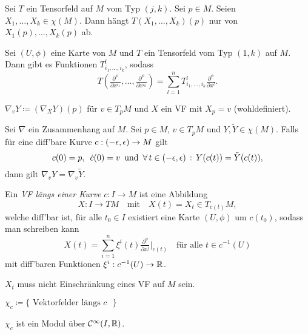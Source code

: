 \documentclass{cheat-sheet}
\newcommand{\coord}[1]{\tfrac{\partial^\phi}{\partial x^{#1}}} %
\newcommand{\vinterval}{\ointerval{-\epsilon}{\epsilon}} %
\newcommand{\Cont}{\mathcal{C}} %
\begin{document}
\begin{satz}
  Sei $T$ ein Tensorfeld auf $M$ vom Typ $(j, k)$. Sei $p \in M$. Seien $X_1, \ldots, X_k \in \chi(M)$. Dann hängt $T(X_1, \ldots, X_k)(p)$ nur von $X_1(p), \ldots, X_k(p)$ ab.
\end{satz}


\begin{bem}
  Sei $(U, \phi)$ eine Karte von $M$ und $T$ ein Tensorfeld vom Typ $(1, k)$ auf $M$. Dann gibt es Funktionen $T_{i_1, \ldots, i_k}^l$, sodass
  \[ T(\coord{i_1}, \ldots, \coord{i_k}) = \sum_{l=1}^n T_{i_1, \ldots, i_k}^l \coord{l}. \]
\end{bem}

\begin{nota}
  $\nabla_v Y \coloneqq (\nabla_X Y)(p)$ für $v \in T_p M$ und $X$ ein VF mit $X_p = v$ (wohldefiniert).
\end{nota}

\begin{satz}
  Sei $\nabla$ ein Zusammenhang auf $M$. Sei $p \in M$, $v \in T_p M$ und $Y, \tilde{Y} \in \chi(M)$. Falls für eine diff'bare Kurve $c : \vinterval \to M$ gilt
  \[
    c(0) = p, \enspace
    \dot{c}(0) = v \enspace \text{und} \enspace
    \fa{t \in \vinterval} Y(c(t)) = \tilde{Y}(c(t)),
  \]
  dann gilt $\nabla_v Y = \nabla_v \tilde{Y}$.
\end{satz}


\begin{defn}
  Ein \emph{VF längs einer Kurve} $c : I \to M$ ist eine Abbildung
  \[
    X : I \to TM
    \quad \text{mit} \quad
    X(t) = X_t \in T_{c(t)} M,
  \]
  welche diff'bar ist, \dh{} für alle $t_0 \in I$ existiert eine Karte $(U, \phi)$ um $c(t_0)$, sodass man schreiben kann
  \[
    X(t) = \sum_{i=1}^n \xi^i(t) \coord{j}|_{c(t)} \quad \text{für alle } t \in c^{-1}(U)
  \]
  mit diff'baren Funktionen $\xi^i : c^{-1}(U) \to \mathbb{R}$.
\end{defn}

\begin{bem}
  $X_t$ muss nicht Einschränkung eines VF auf $M$ sein.
\end{bem}

\begin{nota}
  $\chi_c \coloneqq \{ \text{ Vektorfelder längs $c$ } \}$
\end{nota}

\begin{bem}
  $\chi_c$ ist ein Modul über $\Cont^\infty(I, \R)$.
\end{bem}
\end{document}
